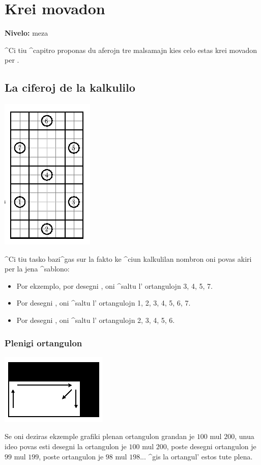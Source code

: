 \chapter{Krei movadon}
{ }\hfill\textbf{Nivelo:} meza

^Ci tiu ^capitro proponas du aferojn tre malsamajn kies celo estas krei
movadon per \xlogo.

\section{La ciferoj de la kalkulilo}

\begin{center}
\includegraphics{bildoj/animation-chiffre.png}
\end{center}

^Ci tiu tasko bazi^gas sur la fakto ke ^ciun kalkulilan nombron oni
povas akiri per la jena ^sablono:
\begin{itemize}
\item Por ekzemplo, por desegni \fg, oni ^saltu l' ortangulojn 3, 4, 5, 7.
\item Por desegni \fg, oni ^saltu l' ortangulojn 1, 2, 3, 4, 5, 6, 7.
\item Por desegni \fg, oni ^saltu l' ortangulojn 2, 3, 4, 5, 6.
\end{itemize}

\subsection{Plenigi ortangulon}
\begin{center}
\includegraphics{bildoj/animation-rectangle.png}
\end{center}
Se oni deziras ekzemple grafiki plenan ortangulon grandan je $100$ mul
$200$, unua ideo povas esti desegni la ortangulon je $100$ mul $200$,
poste desegni ortangulon je $99$ mul $199$, poste ortangulon je $98$
mul $198$... ^gis la ortangul' estos tute plena.

